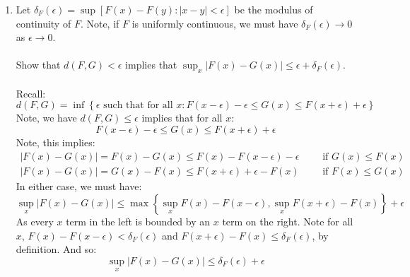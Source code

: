 \documentclass[12pt,a4paper]{article}
\newcommand{\1}[1]{\mathbbm{1}\left\{ #1 \right\}}
\begin{document}
\begin{enumerate}
	\item Let $\delta_F(\epsilon) = \sup\left[F(x) - F(y) : |x-y| < \epsilon\right]$ be the modulus of continuity of $F$. Note, if $F$ is uniformly continuous, we must have $\delta_F(\epsilon) \to 0$ as $\epsilon \to 0$.
	\\\\
	Show that $d(F,G) < \epsilon$ implies that $\sup_x|F(x) - G(x)| \leq \epsilon + \delta_F(\epsilon)$.
	\\\\
	Recall:
	$$
		d(F,G) = \inf\left\{\epsilon \text{ such that for all $x$}: 
		F(x - \epsilon) - \epsilon \leq G(x) \leq F(x + \epsilon) + \epsilon\right\}
	$$
	Note, we have $d(F,G) \leq \epsilon$ implies that for all $x$:
	$$
		F(x - \epsilon) - \epsilon \leq G(x) \leq F(x + \epsilon) + \epsilon
	$$
	Note, this implies:
	\begin{align*}
	|F(x) - G(x)| = F(x) - G(x) \leq F(x) - F(x - \epsilon) - \epsilon \quad\quad\text{ if $G(x) \leq F(x)$}\\
	|F(x) - G(x)| = G(x) - F(x) \leq F(x + \epsilon) + \epsilon - F(x) \quad\quad\text{ if $F(x) \leq G(x)$}
	\end{align*}
	In either case, we must have:
	$$
		\sup_x|F(x) - G(x)| \leq \max\left\{\sup_x F(x) - F(x - \epsilon), \sup_x F(x + \epsilon) - F(x)\right\} + \epsilon
	$$
	As every $x$ term in the left is bounded by an $x$ term on the right. Note for all $x$, $F(x) - F(x - \epsilon) < \delta_F(\epsilon)$ and $F(x + \epsilon) - F(x) \leq \delta_F(\epsilon)$, by definition. And so:
	$$
		\sup_x|F(x) - G(x)| \leq \delta_F(\epsilon) + \epsilon
	$$
	

\end{enumerate}
\end{document}
